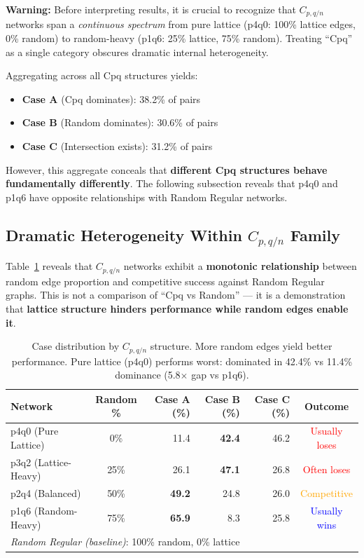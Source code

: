 \documentclass[12pt,a4paper]{article}
\begin{document}
\textbf{Warning:} Before interpreting results, it is crucial to recognize that $C_{p,q/n}$ networks span a \textit{continuous spectrum} from pure lattice (p4q0: 100\% lattice edges, 0\% random) to random-heavy (p1q6: 25\% lattice, 75\% random). Treating ``Cpq'' as a single category obscures dramatic internal heterogeneity.

Aggregating across all Cpq structures yields:
\begin{itemize}
    \item \textbf{Case A} (Cpq dominates): 38.2\% of pairs
    \item \textbf{Case B} (Random dominates): 30.6\% of pairs
    \item \textbf{Case C} (Intersection exists): 31.2\% of pairs
\end{itemize}

However, this aggregate conceals that \textbf{different Cpq structures behave fundamentally differently}. The following subsection reveals that p4q0 and p1q6 have opposite relationships with Random Regular networks.

\subsection{Dramatic Heterogeneity Within \texorpdfstring{$C_{p,q/n}$}{C(p,q/n)} Family}

Table~\ref{tab:network_cases} reveals that $C_{p,q/n}$ networks exhibit a \textbf{monotonic relationship} between random edge proportion and competitive success against Random Regular graphs. This is not a comparison of ``Cpq vs Random'' --- it is a demonstration that \textbf{lattice structure hinders performance while random edges enable it}.

\begin{table}[H]
\centering
\begin{tabular}{@{}lcrrrc@{}}
\toprule
\textbf{Network} & \textbf{Random \%} & \textbf{Case A (\%)} & \textbf{Case B (\%)} & \textbf{Case C (\%)} & \textbf{Outcome} \\
\midrule
p4q0 (Pure Lattice)  & 0\%  & 11.4 & \textbf{42.4} & 46.2 & \textcolor{red}{Usually loses} \\
p3q2 (Lattice-Heavy) & 25\% & 26.1 & \textbf{47.1} & 26.8 & \textcolor{red}{Often loses} \\
p2q4 (Balanced)      & 50\% & \textbf{49.2} & 24.8 & 26.0 & \textcolor{orange}{Competitive} \\
p1q6 (Random-Heavy)  & 75\% & \textbf{65.9} &  8.3 & 25.8 & \textcolor{blue}{Usually wins} \\
\midrule
\multicolumn{6}{l}{\textit{Random Regular (baseline)}: 100\% random, 0\% lattice} \\
\bottomrule
\end{tabular}
\caption{Case distribution by $C_{p,q/n}$ structure. More random edges yield better performance. Pure lattice (p4q0) performs worst: dominated in 42.4\% vs 11.4\% dominance (5.8$\times$ gap vs p1q6).}
\label{tab:network_cases}
\end{table}
\end{document}
